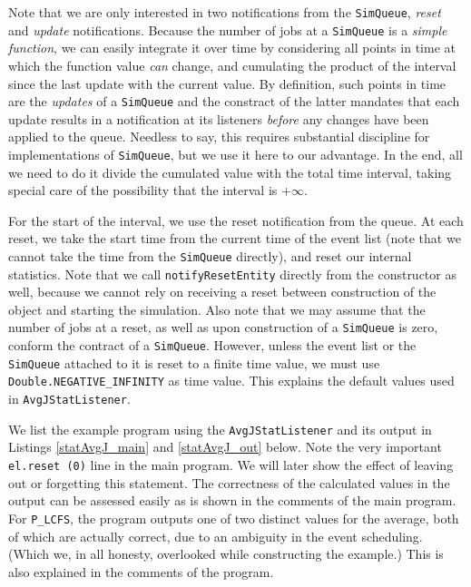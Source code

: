 \documentclass[12pt]{book}
\begin{document}
Note that we are only interested in two notifications from the \lstinline|SimQueue|,
  {\em reset\/} and {\em update\/} notifications.
Because the number of jobs at a \lstinline|SimQueue| is a {\em simple function},
  we can easily integrate it over time by considering all
  points in time at which the function value
  {\em can} change,
  and cumulating the product of the interval since the last update with the current value.
By definition, such points in time are the {\em updates\/} of a
  \lstinline|SimQueue| and the constract of the latter  mandates
  that each update results in a notification
  at its listeners {\em before\/} any changes have been applied to the queue.
Needless to say, this requires substantial discipline for implementations of \lstinline|SimQueue|,
  but we use it here to our advantage.
In the end, all we need to do it divide the cumulated value with
  the total time interval,
  taking special care of the possibility that the interval is $+\infty$.

For the start of the interval, we use the reset notification from the queue.
At each reset, we take the start time from the current time of the
  event list (note that we cannot take the time from the \lstinline-SimQueue- directly),
  and reset our internal statistics.
Note that we call \lstinline|notifyResetEntity| directly from the constructor as well,
  because we cannot rely on receiving a reset between construction of the object
  and starting the simulation.
Also note that we may assume that the number of jobs at a reset,
  as well as upon construction of a \lstinline-SimQueue- is zero,
  conform the contract of a \lstinline-SimQueue-.
However, unless the event list or the \lstinline-SimQueue- attached to it
  is reset to a finite time value,
  we must use \lstinline-Double.NEGATIVE_INFINITY- as time value.
This explains the default values used in
  \lstinline-AvgJStatListener-.

We list the example program using the \lstinline|AvgJStatListener|
  and its output in
  Listings \ref{statAvgJ_main}
  and
  \ref{statAvgJ_out}
  below.
Note the very important \lstinline-el.reset (0)- line in the main program.
We will later show the effect of leaving out or forgetting this statement.
The correctness of the calculated values in the output
  can be assessed easily
  as is shown in the comments of the main program.
For \lstinline-P_LCFS-, the program outputs one of two distinct values for the average,
  both of which are actually correct, due to an ambiguity in the event scheduling.
(Which we, in all honesty, overlooked while constructing the example.)
This is also explained in the comments of the program.
\end{document}
